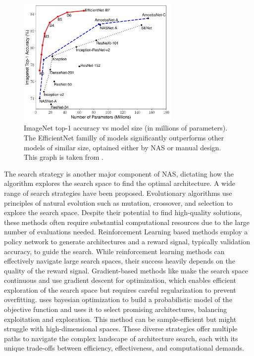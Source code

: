 \begin{figure}[htbp]
    \centering
    \includegraphics[width=0.70\textwidth]{chapter_sota/assets/efficientnet_perfs_overview.pdf}   
    \caption{ImageNet top-1 accuracy vs model size (in millions of parameters).
    The EfficientNet familly of models significantly outperforms other models of
    similar size, optained either by \ac{NAS} or manual design. This graph is
    taken from \cite{DBLP:conf/icml/TanL19}.
    }
    \label{fig:sota:efficientnet_perfs}
\end{figure}


The search strategy is another major component of \ac{NAS}, dictating how the
algorithm explores the search space to find the optimal architecture. A wide
range of search strategies have been proposed. Evolutionary algorithms
\cite{DBLP:conf/icml/RealMSSSTLK17} use principles of natural evolution such as
mutation, crossover, and selection to explore the search space. Despite their
potential to find high-quality solutions, these methods often require
substantial computational resources due to the large number of evaluations
needed. Reinforcement Learning based methods \cite{DBLP:conf/iclr/ZophL17}
employ a policy network to generate architectures and a reward signal, typically
validation accuracy, to guide the search. While reinforcement learning methods
can effectively navigate large search spaces, their success heavily depends on
the quality of the reward signal. Gradient-based methods like
\cite{DBLP:conf/iclr/LiuSY19,DBLP:conf/iclr/XuX0CQ0X20} make the search space
continuous and use gradient descent for optimization, which enables efficient
exploration of the search space but requires careful regularization to prevent
overfitting. \cite{DBLP:conf/nips/BergstraBBK11} uses bayesian optimization to
build a probabilistic model of the objective function and uses it to select
promising architectures, balancing exploitation and exploration. This method can
be sample-efficient but might struggle with high-dimensional spaces. These
diverse strategies offer multiple paths to navigate the complex landscape of
architecture search, each with its unique trade-offs between efficiency,
effectiveness, and computational demands.


